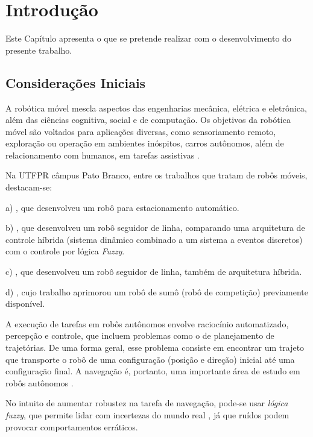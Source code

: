 \chapter{Introdução}
\vspace{-2.5 cm}

Este Capítulo apresenta o que se pretende realizar com o desenvolvimento do
presente trabalho.

\section{Considerações Iniciais} 

A robótica móvel mescla aspectos das engenharias mecânica, elétrica e
eletrônica, além das ciências cognitiva, social e de computação. Os objetivos da
robótica móvel são voltados para aplicações diversas, como sensoriamento remoto,
exploração ou operação em ambientes inóspitos, carros autônomos, além de
relacionamento com humanos, em tarefas assistivas \cite{Livro_Siegwart}.

Na UTFPR câmpus Pato Branco, entre os trabalhos que tratam de robôs móveis,
destacam-se: 

a) , que desenvolveu um robô para estacionamento
automático.

b) , que desenvolveu um robô seguidor de linha,
comparando uma arquitetura de controle híbrida (sistema dinâmico combinado a um
sistema a eventos discretos) com o controle por lógica \textit{Fuzzy}.

c) , que desenvolveu um robô seguidor de linha, também de
arquitetura híbrida.

d) , cujo trabalho aprimorou um robô de
sumô (robô de competição) previamente disponível. 

A execução de tarefas em robôs autônomos envolve raciocínio automatizado,
percepção e controle, que incluem problemas como o de planejamento de
trajetórias. De uma forma geral, esse problema consiste em encontrar um
trajeto que transporte o robô de uma configuração (posição e direção)
inicial até uma configuração final. A navegação é, portanto, uma importante área
de estudo em robôs autônomos \cite{mest_marchi, mest_neto, Tcc_Ottoni}.

No intuito de aumentar robustez na tarefa de navegação, pode-se usar
\textit{lógica fuzzy}, que permite lidar com incertezas do mundo real
\cite{inbook:FuzzyNavigationIntech}, já que ruídos podem provocar comportamentos
erráticos.

